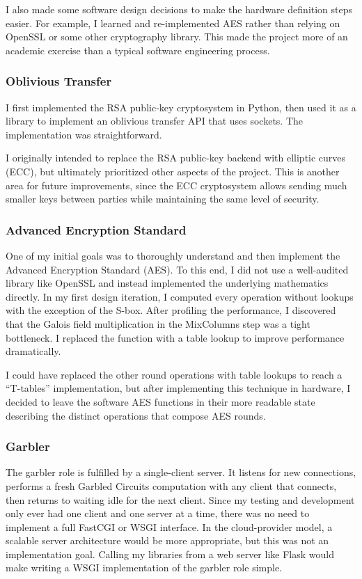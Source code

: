 I also made some software design decisions to make the hardware definition steps easier. For example, I learned and re-implemented AES rather than relying on OpenSSL or some other cryptography library. This made the project more of an academic exercise than a typical software engineering process.

\subsubsection{Oblivious Transfer}
I first implemented the RSA public-key cryptosystem in Python, then used it as a library to implement an oblivious transfer API that uses sockets. The implementation was straightforward.

I originally intended to replace the RSA public-key backend with elliptic curves (ECC), but ultimately prioritized other aspects of the project. This is another area for future improvements, since the ECC cryptosystem allows sending much smaller keys between parties while maintaining the same level of security.

\subsubsection{Advanced Encryption Standard}
One of my initial goals was to thoroughly understand and then implement the Advanced Encryption Standard (AES). To this end, I did not use a well-audited library like OpenSSL and instead implemented the underlying mathematics directly. In my first design iteration, I computed every operation without lookups with the exception of the S-box. After profiling the performance, I discovered that the Galois field multiplication in the MixColumns step was a tight bottleneck. I replaced the function with a table lookup to improve performance dramatically.

I could have replaced the other round operations with table lookups to reach a ``T-tables'' implementation, but after implementing this technique in hardware, I decided to leave the software AES functions in their more readable state describing the distinct operations that compose AES rounds.

\subsubsection{Garbler}
The garbler role is fulfilled by a single-client server. It listens for new connections, performs a fresh Garbled Circuits computation with any client that connects, then returns to waiting idle for the next client. Since my testing and development only ever had one client and one server at a time, there was no need to implement a full FastCGI or WSGI interface. In the cloud-provider model, a scalable server architecture would be more appropriate, but this was not an implementation goal. Calling my libraries from a web server like Flask would make writing a WSGI implementation of the garbler role simple.

